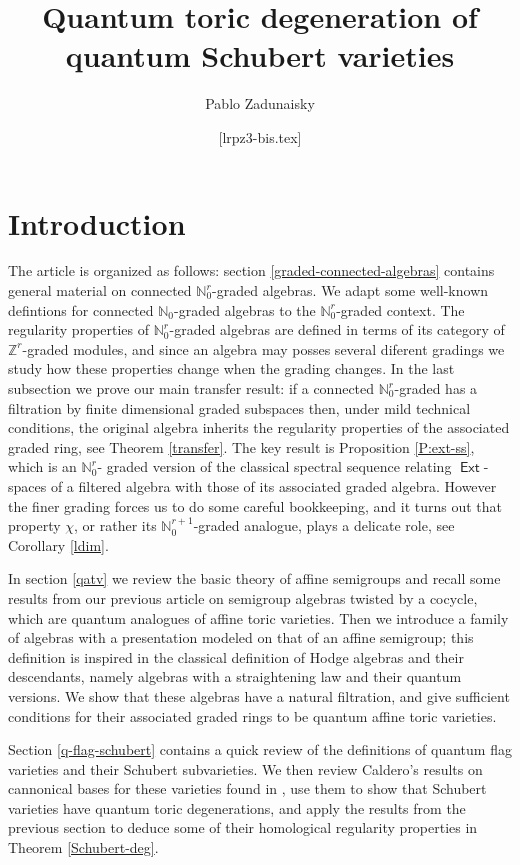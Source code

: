 \documentclass[11pt,fleqn]{article}
\title{Quantum toric degeneration of quantum Schubert varieties}
\date{[lrpz3-bis.tex]}
\author{Pablo Zadunaisky}
\newcommand\NN{\mathbb N}
\newcommand\ZZ{\mathbb Z}
\DeclareMathOperator\Ext{\mathsf{Ext}}
\begin{document}
\maketitle


\section{Introduction}

The article is organized as follows: section \ref{graded-connected-algebras} contains
general material on connected $\NN_0^r$-graded algebras. We adapt some well-known 
defintions for connected $\NN_0$-graded algebras to the $\NN_0^r$-graded context. The 
regularity properties of $\NN_0^r$-graded algebras are defined in terms of its category 
of $\ZZ^r$-graded modules, and since an algebra may posses several diferent gradings we 
study how these properties change when the grading changes. In the last subsection we 
prove our main transfer result: if a connected $\NN_0^r$-graded has a filtration by 
finite dimensional graded subspaces then, under mild technical conditions, the original 
algebra inherits the regularity properties of the associated graded ring, see Theorem 
\ref{transfer}. The key result is Proposition \ref{P:ext-ss}, which is an $\NN_0^r$-
graded version of the classical spectral sequence relating $\Ext$-spaces of a filtered 
algebra with those of its associated graded algebra. However the finer grading forces us 
to do some careful bookkeeping, and it turns out that property $\chi$, or rather its 
$\NN_0^{r+1}$-graded analogue, plays a delicate role, see Corollary \ref{ldim}.

In section \ref{qatv} we review the basic theory of affine semigroups and recall some 
results from our previous article \cite{RZ2} on semigroup algebras twisted by a cocycle, 
which are quantum analogues of affine toric varieties. Then we introduce a family of 
algebras with a presentation modeled on that of an affine semigroup; this definition is 
inspired in the classical definition of Hodge algebras and their descendants, namely 
algebras with a straightening law and their quantum versions. We show that these 
algebras have a natural filtration, and give  sufficient conditions for their associated 
graded rings to be quantum affine toric varieties.

Section \ref{q-flag-schubert} contains a quick review of the definitions of quantum flag
varieties and their Schubert subvarieties. We then review Caldero's results on 
cannonical bases for these varieties found in \cite{C}, use them to show that Schubert 
varieties have quantum toric degenerations, and apply the results from the previous
section to deduce some of their homological regularity properties in Theorem 
\ref{Schubert-deg}. 
\end{document}
